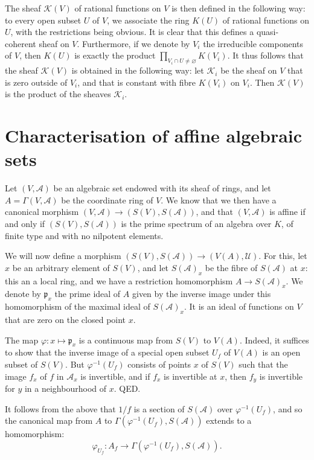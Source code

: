 \documentclass{article}
\theoremstyle{plain}
\newcommand{\scr}[1]{{\mathscr{#1}}}
\newcommand{\oldpage}[1]{\marginpar{\footnotesize$\Big\vert$ \textit{p.~#1}}}
\begin{document}
The sheaf $\scr{K}(V)$ of rational functions on $V$ is then defined in the following way:
to every open subset $U$ of $V$, we associate the ring $K(U)$ of
\oldpage{2-04}
rational functions on $U$, with the restrictions being obvious.
It is clear that this defines a quasi-coherent sheaf on $V$.
Furthermore, if we denote by $V_i$ the irreducible components of $V$, then $K(U)$ is exactly the product $\prod_{V_i\cap U\neq\varnothing}K(V_i)$.
It thus follows that the sheaf $\scr{K}(V)$ is obtained in the following way:
let $\scr{K}_i$ be the sheaf on $V$ that is zero outside of $V_i$, and that is constant with fibre $K(V_i)$ on $V_i$.
Then $\scr{K}(V)$ is the product of the sheaves $\scr{K}_i$.


\section{Characterisation of affine algebraic sets}
\label{section4}

Let $(V,\scr{A})$ be an algebraic set endowed with its sheaf of rings, and let $A=\Gamma(V,\scr{A})$ be the coordinate ring of $V$.
We know that we then have a canonical morphism $(V,\scr{A})\to(S(V),S(\scr{A}))$, and that $(V,\scr{A})$ is affine if and only if $(S(V),S(\scr{A}))$ is the prime spectrum of an algebra over $K$, of finite type and with no nilpotent elements.

We will now define a morphism $(S(V),S(\scr{A}))\to(V(A),\scr{U})$.
For this, let $x$ be an arbitrary element of $S(V)$, and let $S(\scr{A})_x$ be the fibre of $S(\scr{A})$ at $x$: this an a local ring, and we have a restriction homomorphism $A\to S(\scr{A})_x$.
We denote by $\mathfrak{p}_x$ the prime ideal of $A$ given by the inverse image under this homomorphism of the maximal ideal of $S(\scr{A})_x$.
It is an ideal of functions on $V$ that are zero on the closed point $x$.

The map $\varphi\colon x\mapsto\mathfrak{p}_x$ is a continuous map from $S(V)$ to $V(A)$.
Indeed, it suffices to show that the inverse image of a special open subset $U_f$ of $V(A)$ is an open subset of $S(V)$.
But $\varphi^{-1}(U_f)$ consists of points $x$ of $S(V)$ such that the image $f_x$ of $f$ in $\scr{A}_x$ is invertible, and if $f_x$ is invertible at $x$, then $f_y$ is invertible for $y$ in a neighbourhood of $x$.
QED.

It follows from the above that $1/f$ is a section of $S(\scr{A})$ over $\varphi^{-1}(U_f)$, and so the canonical map from $A$ to $\Gamma(\varphi^{-1}(U_f),S(\scr{A}))$ extends to a homomorphism:
\[
  \varphi_{U_f}\colon A_f \to \Gamma(\varphi^{-1}(U_f), S(\scr{A})).
\]
\end{document}
